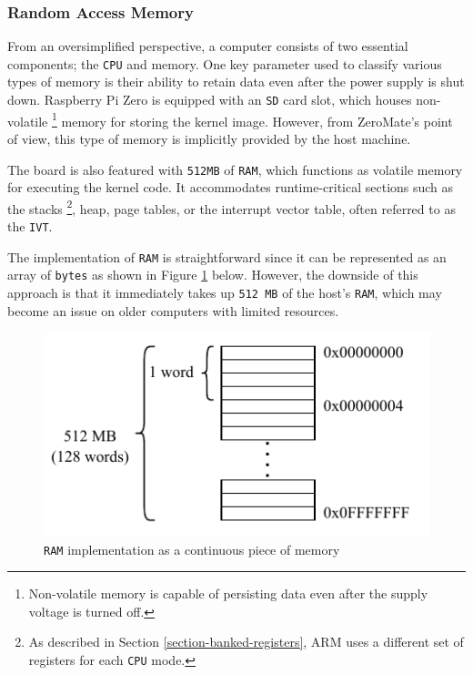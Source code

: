 \documentclass[english, ing, kiv, he, iso690numb, pdf]{fasthesis}
\begin{document}
	\newpage
	
	\subsubsection{Random Access Memory}
	
	From an oversimplified perspective, a computer consists of two essential components; the \texttt{CPU} and memory. One key parameter used to classify various types of memory is their ability to retain data even after the power supply is shut down. Raspberry Pi Zero is equipped with an \texttt{SD} card slot, which houses non-volatile \footnote{Non-volatile memory is capable of persisting data even after the supply voltage is turned off.} memory for storing the kernel image. However, from ZeroMate's point of view, this type of memory is implicitly provided by the host machine.
	
	The board is also featured with \texttt{512MB} of \texttt{RAM}, which functions as volatile memory for executing the kernel code. It accommodates runtime-critical sections such as the stacks \footnote{As described in Section \ref{section-banked-registers}, ARM uses a different set of registers for each \texttt{CPU} mode.}, heap, page tables, or the interrupt vector table, often referred to as the \texttt{IVT}. 
	
	The implementation of \texttt{RAM} is straightforward since it can be represented as an array of \texttt{bytes} as shown in Figure \ref{RAM implementation as a continuous piece of memory} below. However, the downside of this approach is that it immediately takes up \texttt{512 MB} of the host's \texttt{RAM}, which may become an issue on older computers with limited resources.
	
	\begin{figure}[ht]
		\centering
		\includegraphics[width=.7\textwidth]{img/diagrams/ram.pdf}
		\caption{\texttt{RAM} implementation as a continuous piece of memory}
		\label{RAM implementation as a continuous piece of memory}
	\end{figure}
	
\end{document}
